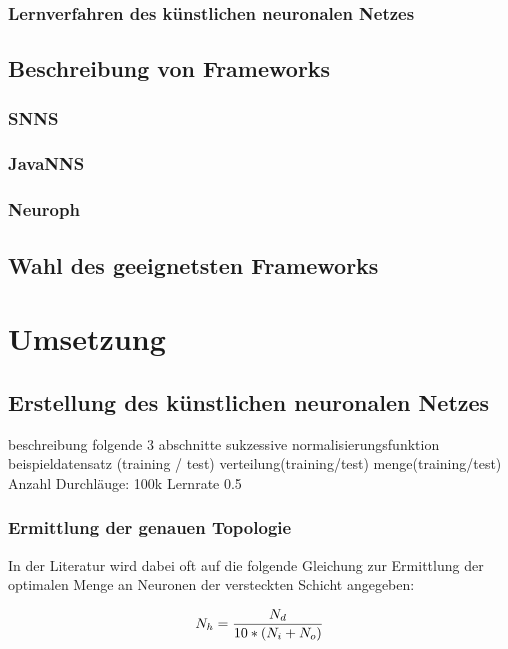 \documentclass[a4paper,DIV11,bibliography=totoc,headings=normal,ngerman,headsepline,listof=totoc,parskip=half]{scrreprt}
\newcommand*{\formelentry}[1]{\addcontentsline{for}{formel}{\protect\numberline{Formel~\theequation} #1}}
\begin{document}
\subsection{Lernverfahren des künstlichen neuronalen Netzes} %
\section{Beschreibung von Frameworks} %
\subsection{SNNS} %
\subsection{JavaNNS}  %
\subsection{Neuroph} %
\section{Wahl des geeignetsten Frameworks} %
\chapter{Umsetzung} %
\section{Erstellung des künstlichen neuronalen Netzes} %

beschreibung folgende 3 abschnitte sukzessive
normalisierungsfunktion
beispieldatensatz (training / test)
verteilung(training/test)
menge(training/test)
Anzahl Durchläuge: 100k
Lernrate 0.5


\subsection{Ermittlung der genauen Topologie} %
In der Literatur wird dabei oft auf die folgende Gleichung zur Ermittlung der optimalen  Menge an Neuronen der versteckten Schicht angegeben:

\begin{equation}\formelentry{Optimale Anzahl Neuronen in der versteckten Schicht}
  N_h = \frac{N_d}{10*(N_i+N_o)}
\end{equation}
\end{document}
